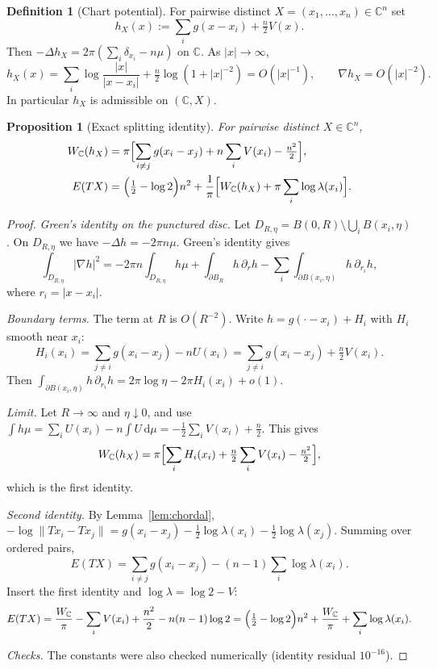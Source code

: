 \documentclass[11pt]{article}
\newtheorem{proposition}[theorem]{Proposition}
\theoremstyle{definition}
\newtheorem{definition}[theorem]{Definition}
\theoremstyle{remark}
\newcommand{\C}{\mathbb C}
\newcommand{\dd}{\,\mathrm d}
\begin{document}
\begin{definition}[Chart potential]\label{def:hX}
For pairwise distinct $X=(x_1,\dots,x_n)\in\C^n$ set
\[
h_X(x):=\sum_i g(x-x_i)+\tfrac n2V(x) .
\]
Then $-\Delta h_X=2\pi(\sum_i\delta_{x_i}-n\mu)$ on $\C$. As $|x|\to\infty$,
\[
h_X(x)=\sum_i\log\frac{|x|}{|x-x_i|}+\tfrac n2\log(1+|x|^{-2})=O(|x|^{-1}),
\qquad
\nabla h_X=O(|x|^{-2}).
\]
In particular $h_X$ is admissible on $(\C,X)$.
\end{definition}

\begin{proposition}[Exact splitting identity]\label{prop:splitting}
For pairwise distinct $X\in\C^n$,
\begin{align*}
W_\C(h_X)&=\pi\Bigl[\sum_{i\ne j}g(x_i-x_j)+n\sum_iV(x_i)-\tfrac{n^2}2\Bigr],\\
E(TX)&=\Bigl(\tfrac12-\log2\Bigr)n^2+\frac1\pi\Bigl[W_\C(h_X)+\pi\sum_i\log\lambda(x_i)\Bigr].
\end{align*}
\end{proposition}
\begin{proof}
\emph{Green's identity on the punctured disc.} Let $D_{R,\eta}=B(0,R)\setminus\bigcup_iB(x_i,\eta)$.
On $D_{R,\eta}$ we have $-\Delta h=-2\pi n\mu$. Green's identity gives
\[
\int_{D_{R,\eta}}|\nabla h|^2=-2\pi n\int_{D_{R,\eta}}h\mu+\int_{\partial B_R}h\,\partial_rh
-\sum_i\int_{\partial B(x_i,\eta)}h\,\partial_{r_i}h,
\]
where $r_i=|x-x_i|$.

\emph{Boundary terms.} The term at $R$ is $O(R^{-2})$. Write $h=g(\cdot-x_i)+H_i$ with $H_i$
smooth near $x_i$:
\[
H_i(x_i)=\sum_{j\ne i}g(x_i-x_j)-nU(x_i)=\sum_{j\ne i}g(x_i-x_j)+\tfrac n2V(x_i).
\]
Then $\int_{\partial B(x_i,\eta)}h\,\partial_{r_i}h=2\pi\log\eta-2\pi H_i(x_i)+o(1)$.

\emph{Limit.} Let $R\to\infty$ and $\eta\downarrow0$, and use
$\int h\mu=\sum_iU(x_i)-n\int U\dd\mu=-\tfrac12\sum_iV(x_i)+\tfrac n2$. This gives
\[
W_\C(h_X)=\pi\Bigl[\sum_iH_i(x_i)+\tfrac n2\sum_iV(x_i)-\tfrac{n^2}2\Bigr],
\]
which is the first identity.

\emph{Second identity.} By Lemma~\ref{lem:chordal}, $-\log\|Tx_i-Tx_j\|=g(x_i-x_j)-\tfrac12\log\lambda(x_i)-\tfrac12\log\lambda(x_j)$. Summing over ordered pairs,
\[
E(TX)=\sum_{i\ne j}g(x_i-x_j)-(n-1)\sum_i\log\lambda(x_i).
\]
Insert the first identity and $\log\lambda=\log2-V$:
\[
E(TX)=\frac{W_\C}{\pi}-\sum_iV(x_i)+\frac{n^2}{2}-n(n-1)\log 2
=\Bigl(\tfrac12-\log2\Bigr)n^2+\frac{W_\C}\pi+\sum_i\log\lambda(x_i).
\]

\emph{Checks.} The constants were also checked numerically (identity residual $10^{-16}$).
\end{proof}
\end{document}
